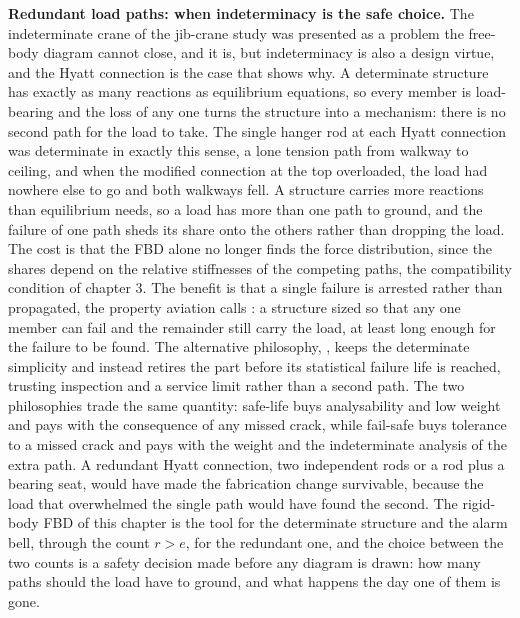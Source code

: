 \begin{mastery}
\textbf{Redundant load paths: when indeterminacy is the safe choice.} The
indeterminate crane of the jib-crane study was presented as a problem the
free-body diagram cannot close, and it is, but indeterminacy is also a design
virtue, and the Hyatt connection is the case that shows why. A determinate
structure has exactly as many reactions as equilibrium equations, so every
member is load-bearing and the loss of any one turns the structure into a
mechanism: there is no second path for the load to take. The single hanger rod
at each Hyatt connection was determinate in exactly this sense, a lone tension
path from walkway to ceiling, and when the modified connection at the top
overloaded, the load had nowhere else to go and both walkways fell. A
 structure carries more reactions than equilibrium needs, so
a load has more than one path to ground, and the failure of one path sheds its
share onto the others rather than dropping the load. The cost is that the FBD
alone no longer finds the force distribution, since the shares depend on the
relative stiffnesses of the competing paths, the compatibility condition of
chapter 3. The benefit is that a single failure is arrested rather than
propagated, the property aviation calls : a structure sized
so that any one member can fail and the remainder still carry the load, at least
long enough for the failure to be found. The alternative philosophy,
, keeps the determinate simplicity and instead retires the
part before its statistical failure life is reached, trusting inspection and a
service limit rather than a second path. The two philosophies trade the same
quantity: safe-life buys analysability and low weight and pays with the
consequence of any missed crack, while fail-safe buys tolerance to a missed
crack and pays with the weight and the indeterminate analysis of the extra path.
A redundant Hyatt connection, two independent rods or a rod plus a bearing seat,
would have made the fabrication change survivable, because the load that
overwhelmed the single path would have found the second. The rigid-body FBD of
this chapter is the tool for the determinate structure and the alarm bell,
through the count $r > e$, for the redundant one, and the choice between the two
counts is a safety decision made before any diagram is drawn: how many paths
should the load have to ground, and what happens the day one of them is gone.
\end{mastery}

